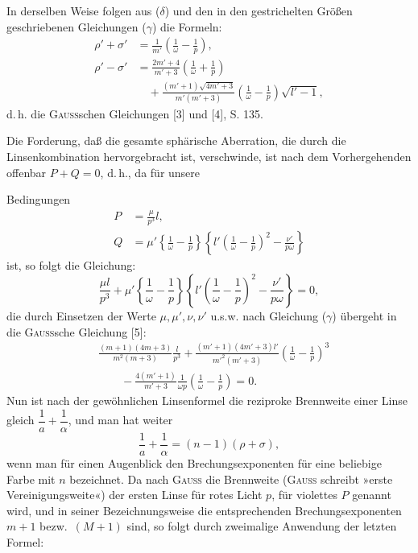 In derselben Weise folgen aus ($\delta$) und den in den gestrichelten Größen geschriebenen Gleichungen ($\gamma$) die Formeln:
\[\begin{aligned}
\rho'+\sigma'&=\frac1{m'}\left(\frac1\omega-\frac1p\right),\\[4pt]
\rho'-\sigma'&=\frac{2m'+4}{m'+3}\left(\frac1\omega+\frac1p\right)\\
&\quad+\frac{(m'+1)\sqrt{4m'+3}}{m'(m'+3)}\left(\frac1\omega-\frac1p\right)\sqrt{l'-1},
\end{aligned}\]
\noindent d.\,h. die \textsc{Gauss}schen Gleichungen [3] und [4], S. 135.

Die Forderung, daß die gesamte sphärische Aberration, die durch die Linsenkombination hervorgebracht ist, verschwinde, ist nach dem Vorhergehenden offenbar $P+Q=0$, d.\,h., da für unsere
\par{}
\clearpage{}
\noindent Bedingungen
\[\begin{aligned}
P&=\frac\mu{p^3}l,\\[4pt]
Q&=\mu'\left\{\frac1\omega-\frac1p\right\}\left\{l'\left(\frac1\omega-\frac1p\right)^2-\frac{\nu'}{p\omega}\right\}
\end{aligned}\]
\noindent ist, so folgt die Gleichung:
\begin{equation*}\tag*{($\iota$)}
\frac{\mu l}{p^3}+\mu'\left\{\frac1\omega-\frac1p\right\}\left\{l'\left(\frac1\omega-\frac1p\right)^2-\frac{\nu'}{p\omega}\right\}=0,
\end{equation*}
\noindent die durch Einsetzen der Werte $\mu,\mu',\nu,\nu'$ u.s.w. nach Gleichung ($\gamma$) übergeht in die \textsc{Gauss}sche Gleichung [5]:
\begin{equation*}\tag*{($\kappa$)}
\begin{aligned}
&\frac{(m+1)(4m+3)}{m^2(m+3)}\frac l{p^3}
+\frac{(m'+1)(4m'+3)l'}{m'^2(m'+3)}\left(\frac1\omega-\frac1p\right)^3\\
&\qquad-\frac{4(m'+1)}{m'+3}\frac1{\omega p}\left(\frac1\omega-\frac1p\right)=0.
\end{aligned}
\end{equation*}
\noindent Nun ist nach der gewöhnlichen Linsenformel die reziproke Brennweite einer Linse gleich $\dfrac1a+\dfrac1\alpha$, und man hat weiter
\[\frac1a+\frac1\alpha=(n-1)(\rho+\sigma),\]
\noindent wenn man für einen Augenblick den Brechungsexponenten für eine beliebige Farbe mit $n$ bezeichnet. Da nach \textsc{Gauss} die Brennweite (\textsc{Gauss} schreibt »erste Vereinigungsweite«) der ersten Linse für rotes Licht $p$, für violettes $P$ genannt wird, und in seiner Bezeichnungsweise die entsprechenden Brechungsexponenten $m+1$ bezw.\ $(M+1)$ sind, so folgt durch zweimalige Anwendung der letzten Formel:
